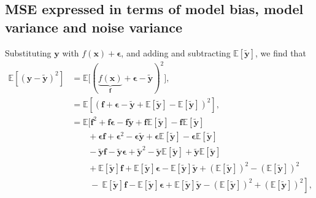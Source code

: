 \documentclass[aps,pra,english,notitlepage,reprint,nofootinbib]{revtex4-1}  %
\begin{document}
\subsection{MSE expressed in terms of model bias, model variance and noise variance}\label{subapp:cost}
Substituting $\mathbf{y}$ with $f(\mathbf{x}) + \boldsymbol{\epsilon}$, and adding and subtracting $\mathbb{E}\left[\mathbf{\tilde{y}}\right]$, we find that
\begin{align*}
\mathbb{E}\left[(\mathbf{y}-\mathbf{\tilde{y}})^2 \right] 
&= \mathbb{E}\Big[(\underbrace{f(\mathbf{x})}_{\mathbf{f}} + \boldsymbol{\epsilon}-\mathbf{\tilde{y}})^2 \Big],
\\
&= \mathbb{E}\left[(\mathbf{f} + \boldsymbol{\epsilon}-\mathbf{\tilde{y}} + \mathbb{E}\left[\mathbf{\tilde{y}}\right] - \mathbb{E}\left[\mathbf{\tilde{y}}\right])^2\right],
\\
&= \mathbb{E}\Big[\mathbf{f}^2 + \mathbf{f}\boldsymbol{\epsilon} - \mathbf{f}\mathbf{\tilde{y}} + \mathbf{f}\mathbb{E}\left[\mathbf{\tilde{y}}\right] - \mathbf{f}\mathbb{E}\left[\mathbf{\tilde{y}}\right] 
\\
&\hspace{23pt} + \boldsymbol{\epsilon}\mathbf{f} + \boldsymbol{\epsilon}^2 - \boldsymbol{\epsilon}\mathbf{\tilde{y}} + \boldsymbol{\epsilon}\mathbb{E}\left[\mathbf{\tilde{y}}\right] - \boldsymbol{\epsilon}\mathbb{E}\left[\mathbf{\tilde{y}}\right]
\\
&\hspace{23pt} - \mathbf{\tilde{y}}\mathbf{f} - \mathbf{\tilde{y}}\boldsymbol{\epsilon} + \mathbf{\tilde{y}}^2 - \mathbf{\tilde{y}}\mathbb{E}\left[\mathbf{\tilde{y}}\right] + \mathbf{\tilde{y}}\mathbb{E}\left[\mathbf{\tilde{y}}\right]
\\
&\hspace{23pt} + \mathbb{E}\left[\mathbf{\tilde{y}}\right]\mathbf{f} + \mathbb{E}\left[\mathbf{\tilde{y}}\right]\boldsymbol{\epsilon} - \mathbb{E}\left[\mathbf{\tilde{y}}\right]\mathbf{\tilde{y}} + \left(\mathbb{E}\left[\mathbf{\tilde{y}}\right]\right)^2 - \left(\mathbb{E}\left[\mathbf{\tilde{y}}\right]\right)^2
\\
&\hspace{23pt} \left. \:-\: \mathbb{E}\left[\mathbf{\tilde{y}}\right]\mathbf{f} - \mathbb{E}\left[\mathbf{\tilde{y}}\right]\boldsymbol{\epsilon} + \mathbb{E}\left[\mathbf{\tilde{y}}\right]\mathbf{\tilde{y}} - \left(\mathbb{E}\left[\mathbf{\tilde{y}}\right]\right)^2 + \left(\mathbb{E}\left[\mathbf{\tilde{y}}\right]\right)^2 \right],
\\

\end{align*}
\end{document}
